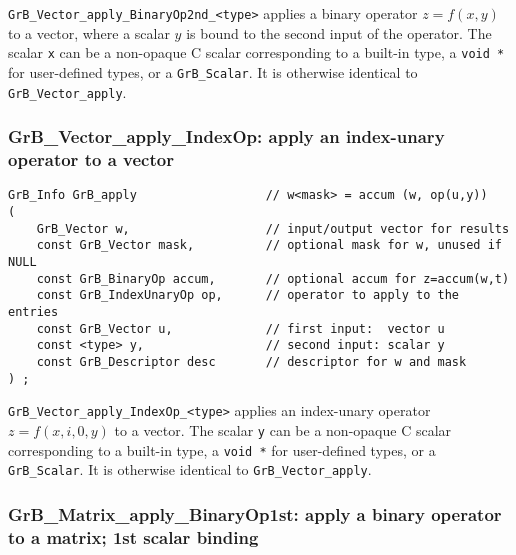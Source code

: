 \documentclass[12pt]{article}
\begin{document}
\verb'GrB_Vector_apply_BinaryOp2nd_<type>'  applies a binary operator
$z=f(x,y)$ to a vector, where a scalar $y$ is bound to the second input of the
operator.
The scalar \verb'x' can be a non-opaque C scalar corresponding to a built-in
type, a \verb'void *' for user-defined types, or a \verb'GrB_Scalar'.
It is otherwise identical to \verb'GrB_Vector_apply'.

\newpage
\subsubsection{{\sf GrB\_Vector\_apply\_IndexOp:} apply an index-unary operator to a vector}
\label{vector_apply_idxunop}

\begin{mdframed}[userdefinedwidth=6in]
{\footnotesize
\begin{verbatim}
GrB_Info GrB_apply                  // w<mask> = accum (w, op(u,y))
(
    GrB_Vector w,                   // input/output vector for results
    const GrB_Vector mask,          // optional mask for w, unused if NULL
    const GrB_BinaryOp accum,       // optional accum for z=accum(w,t)
    const GrB_IndexUnaryOp op,      // operator to apply to the entries
    const GrB_Vector u,             // first input:  vector u
    const <type> y,                 // second input: scalar y
    const GrB_Descriptor desc       // descriptor for w and mask
) ;
\end{verbatim} } \end{mdframed}

\verb'GrB_Vector_apply_IndexOp_<type>'  applies an index-unary operator
$z=f(x,i,0,y)$ to a vector.
The scalar \verb'y' can be a non-opaque C scalar corresponding to a built-in
type, a \verb'void *' for user-defined types, or a \verb'GrB_Scalar'.
It is otherwise identical to \verb'GrB_Vector_apply'.

\subsubsection{{\sf GrB\_Matrix\_apply\_BinaryOp1st:} apply a binary operator to a matrix; 1st scalar binding}
\label{matrix_apply1st}
\end{document}

